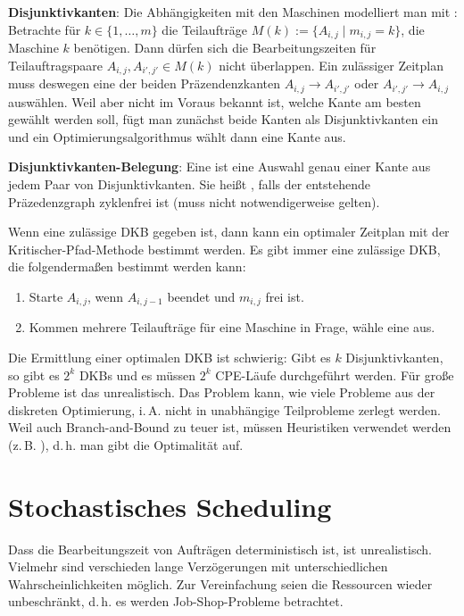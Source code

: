 \textbf{Disjunktivkanten}:
Die Abhängigkeiten mit den Maschinen modelliert man mit :
Betrachte für $k \in \{1, \dotsc, m\}$ die Teilaufträge $M(k) := \{A_{i,j} \;|\; m_{i,j} = k\}$,
die Maschine $k$ benötigen.
Dann dürfen sich die Bearbeitungszeiten für Teilauftragspaare $A_{i,j}, A_{i',j'} \in M(k)$
nicht überlappen.
Ein zulässiger Zeitplan muss deswegen eine der beiden Präzendenzkanten $A_{i,j} \to A_{i',j'}$ oder
$A_{i',j'} \to A_{i,j}$ auswählen.
Weil aber nicht im Voraus bekannt ist, welche Kante am besten gewählt werden soll,
fügt man zunächst beide Kanten als Disjunktivkanten ein und
ein Optimierungsalgorithmus wählt dann eine Kante aus.

\textbf{Disjunktivkanten-Belegung}:
Eine  ist eine Auswahl genau einer Kante aus jedem Paar
von Disjunktivkanten.
Sie heißt , falls der entstehende Präzedenzgraph zyklenfrei ist
(muss nicht notwendigerweise gelten).

Wenn eine zulässige DKB gegeben ist, dann kann ein optimaler Zeitplan
mit der Kritischer-Pfad-Methode bestimmt werden.
Es gibt immer eine zulässige DKB, die folgendermaßen bestimmt werden kann:
\begin{enumerate}
    \item
    Starte $A_{i,j}$, wenn $A_{i,j-1}$ beendet und $m_{i,j}$ frei ist.

    \item
    Kommen mehrere Teilaufträge für eine Maschine in Frage, wähle eine aus.
\end{enumerate}

Die Ermittlung einer optimalen DKB ist schwierig:
Gibt es $k$ Disjunktivkanten, so gibt es $2^k$ DKBs und es müssen $2^k$ CPE-Läufe durchgeführt
werden.
Für große Probleme ist das unrealistisch.
Das Problem kann, wie viele Probleme aus der diskreten Optimierung, i.\,A. nicht in unabhängige
Teilprobleme zerlegt werden.
Weil auch Branch-and-Bound zu teuer ist, müssen Heuristiken verwendet werden
(z.\,B. ), d.\,h. man gibt die Optimalität auf.

\pagebreak

\section{%
    Stochastisches Scheduling%
}

Dass die Bearbeitungszeit von Aufträgen deterministisch ist, ist unrealistisch.
Vielmehr sind verschieden lange Verzögerungen mit unterschiedlichen Wahrscheinlichkeiten möglich.
Zur Vereinfachung seien die Ressourcen wieder unbeschränkt,
d.\,h. es werden Job-Shop-Probleme betrachtet.

